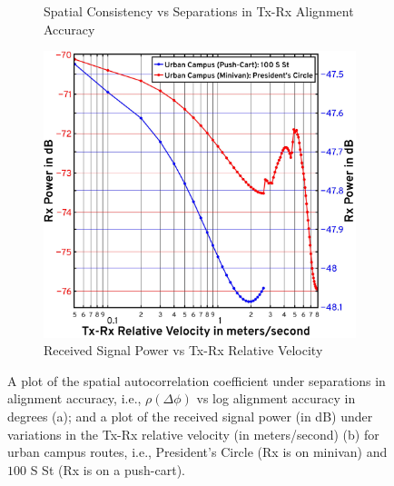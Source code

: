 \documentclass[12pt, draftcls, onecolumn]{IEEEtran}
\begin{document}
{\begin{figure} [t]
\begin{subfigure}{0.4925\linewidth}
        \caption{Spatial Consistency vs Separations in Tx-Rx Alignment Accuracy}
        \label{F8a}
    \end{subfigure}
    \begin{subfigure}{0.4975\linewidth}
        \centering
        \includegraphics[width=1.0\linewidth]{figs/rx_power_vs_velocity.pdf}
        \caption{Received Signal Power vs Tx-Rx Relative Velocity}
        \label{F8b}
    \end{subfigure}
    \vspace{-8mm}
    \caption{A plot of the spatial autocorrelation coefficient under separations in alignment accuracy, i.e., $\rho(\Delta \phi)$ vs log alignment accuracy in degrees (a); and a plot of the received signal power (in dB) under variations in the Tx-Rx relative velocity (in meters/second) (b) for urban campus routes, i.e., President's Circle (Rx is on minivan) and $100$ S St (Rx is on a push-cart).}
    \label{F8}
\end{figure}

}
\end{document}
